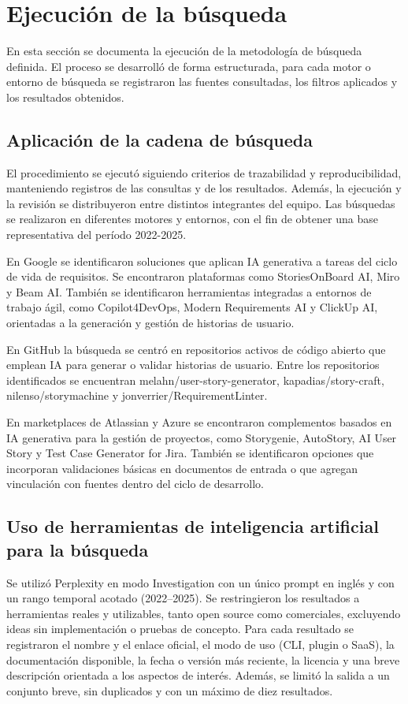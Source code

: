 \section{Ejecución de la búsqueda}
En esta sección se documenta la ejecución de la metodología de búsqueda definida. El proceso se desarrolló de forma estructurada, para cada motor o entorno de búsqueda se registraron las fuentes consultadas, los filtros aplicados y los resultados obtenidos.

\subsection{Aplicación de la cadena de búsqueda}

El procedimiento se ejecutó siguiendo criterios de trazabilidad y reproducibilidad, manteniendo registros de las consultas y de los resultados. Además, la ejecución y la revisión se distribuyeron entre distintos integrantes del equipo. Las búsquedas se realizaron en diferentes motores y entornos, con el fin de obtener una base representativa del período 2022-2025.

En Google se identificaron soluciones que aplican IA generativa a tareas del ciclo de vida de requisitos. Se encontraron plataformas como StoriesOnBoard AI, Miro y Beam AI. También se identificaron herramientas integradas a entornos de trabajo ágil, como Copilot4DevOps, Modern Requirements AI y ClickUp AI, orientadas a la generación y gestión de historias de usuario.

En GitHub la búsqueda se centró en repositorios activos de código abierto que emplean IA para generar o validar historias de usuario. Entre los repositorios identificados se encuentran melahn/user-story-generator, kapadias/story-craft, nilenso/storymachine y jonverrier/RequirementLinter.

En marketplaces de Atlassian y Azure se encontraron complementos basados en IA generativa para la gestión de proyectos, como Storygenie, AutoStory, AI User Story y Test Case Generator for Jira. También se identificaron opciones que incorporan validaciones básicas en documentos de entrada o que agregan vinculación con fuentes dentro del ciclo de desarrollo.

\subsection{Uso de herramientas de inteligencia artificial para la búsqueda}

Se utilizó Perplexity en modo Investigation con un único prompt en inglés y con un rango temporal acotado (2022--2025). Se restringieron los resultados a herramientas reales y utilizables, tanto open source como comerciales, excluyendo ideas sin implementación o pruebas de concepto. Para cada resultado se registraron el nombre y el enlace oficial, el modo de uso (CLI, plugin o SaaS), la documentación disponible, la fecha o versión más reciente, la licencia y una breve descripción orientada a los aspectos de interés. Además, se limitó la salida a un conjunto breve, sin duplicados y con un máximo de diez resultados.

